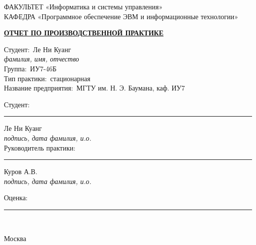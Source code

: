 \begin{titlepage}
	{\doublespacing \small \raggedright ФАКУЛЬТЕТ \hspace{25mm} «Информатика и системы управления»\\
	КАФЕДРА \hspace{5mm} «Программное обеспечение ЭВМ и информационные технологии»\\}

	\vspace{20mm}
	
	\textbf{\underline{ОТЧЕТ ПО ПРОИЗВОДСТВЕННОЙ ПРАКТИКЕ}}\\

	
	\vspace{20mm}

	Студент:       			\hrulefill \,Ле Ни Куанг \hrulefill \\
	{\footnotesize \textit{\hspace{20mm}фамилия, имя, отчество}\\}
	\vspace{2mm}
	Группа:        			\hrulefill \,ИУ7-46Б \hrulefill\\
	\vspace{8mm}
	Тип практики:  			\hrulefill \,стационарная \hrulefill\\
	\vspace{8mm}
	Название предприятия: 	\hrulefill \,МГТУ им. Н. Э. Баумана, каф. ИУ7 \hrulefill

	\vspace{18mm}
	
	
	Студент:				\hspace{42mm}	\hfill \rule{4cm}{0.4pt} \hfill \hrulefill Ле Ни Куанг\hrulefill\\
	{\footnotesize \textit{\hspace{68mm}подпись, дата \hspace{27mm} фамилия, и.о.}\\}
	\vspace{2mm}
	Руководитель практики:	\hspace{5mm}	\hfill \rule{4cm}{0.4pt} \hfill \hrulefill Куров А.В.\hrulefill\\
	{\footnotesize \textit{\hspace{68mm}подпись, дата \hspace{27mm} фамилия, и.о.}\\}

	
	\vspace{18mm}

	{\raggedright Оценка: \rule{4cm}{0.4pt}\\}


	\vfill
	
	Москва\\
	\the\year
\end{titlepage}
